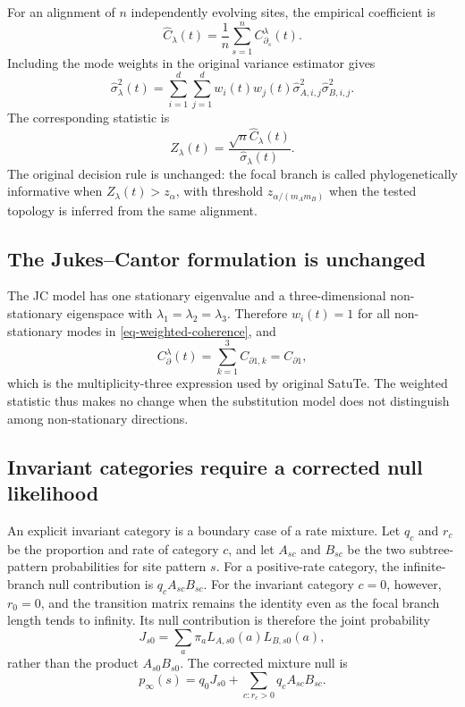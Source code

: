 For an alignment of \(n\) independently evolving sites, the empirical coefficient is
\begin{equation}
\hat C_{\lambda}(t)=\frac{1}{n}\sum_{s=1}^{n}C_{\partial_s}^{\lambda}(t).
\label{eq-weighted-mean}
\end{equation}
Including the mode weights in the original variance estimator gives
\begin{equation}
\hat\sigma_{\lambda}^{2}(t)
=
\sum_{i=1}^{d}\sum_{j=1}^{d}
w_i(t)w_j(t)\hat\sigma_{A,i,j}^{2}\hat\sigma_{B,i,j}^{2}.
\label{eq-weighted-variance}
\end{equation}
The corresponding statistic is
\begin{equation}
Z_{\lambda}(t)=\frac{\sqrt{n}\hat C_{\lambda}(t)}{\hat\sigma_{\lambda}(t)}.
\label{eq-weighted-z}
\end{equation}
The original decision rule is unchanged: the focal branch is called phylogenetically informative when \(Z_{\lambda}(t)>z_\alpha\), with threshold \(z_{\alpha/(m_A m_B)}\) when the tested topology is inferred from the same alignment.

\subsection*{The Jukes--Cantor formulation is unchanged}

The JC model has one stationary eigenvalue and a three-dimensional non-stationary eigenspace with \(\lambda_1=\lambda_2=\lambda_3\). Therefore \(w_i(t)=1\) for all non-stationary modes in \cref{eq-weighted-coherence}, and
\begin{equation}
C_{\partial}^{\lambda}(t)
=
\sum_{k=1}^{3} C_{\partial 1,k}
=
C_{\partial 1},
\label{eq-jc-collapse}
\end{equation}
which is the multiplicity-three expression used by original SatuTe. The weighted statistic thus makes no change when the substitution model does not distinguish among non-stationary directions.

\subsection*{Invariant categories require a corrected null likelihood}

An explicit invariant category is a boundary case of a rate mixture. Let \(q_c\) and \(r_c\) be the proportion and rate of category \(c\), and let \(A_{sc}\) and \(B_{sc}\) be the two subtree-pattern probabilities for site pattern \(s\). For a positive-rate category, the infinite-branch null contribution is \(q_cA_{sc}B_{sc}\). For the invariant category \(c=0\), however, \(r_0=0\), and the transition matrix remains the identity even as the focal branch length tends to infinity. Its null contribution is therefore the joint probability
\begin{equation}
J_{s0}
=
\sum_a \pi_a L_{A,s0}(a)L_{B,s0}(a),
\label{eq-invariant-joint}
\end{equation}
rather than the product \(A_{s0}B_{s0}\). The corrected mixture null is
\begin{equation}
p_\infty(s)
=
q_0J_{s0}
+
\sum_{c:r_c>0}q_cA_{sc}B_{sc}.
\label{eq-invariant-null}
\end{equation}

